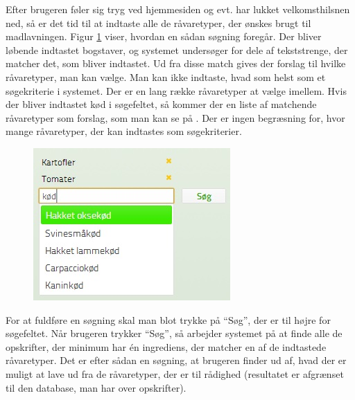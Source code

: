 Efter brugeren føler sig tryg ved hjemmesiden og evt. har lukket velkomsthilsnen ned, så er det tid til at indtaste alle de råvaretyper, der ønskes brugt til madlavningen. Figur \ref{fig:foodl-soegefelt} viser, hvordan en sådan søgning foregår. Der bliver løbende indtastet bogstaver, og systemet undersøger for dele af tekststrenge, der matcher det, som bliver indtastet. Ud fra disse match gives der forslag til hvilke råvaretyper, man kan vælge. Man kan ikke indtaste, hvad som helst som et søgekriterie i systemet. Der er en lang række råvaretyper at vælge imellem. Hvis der \fx bliver indtastet kød i søgefeltet, så kommer der en liste af matchende råvaretyper som forslag, som man kan se på . Der er ingen begræsning for, hvor mange råvaretyper, der kan indtastes som søgekriterier.

\begin{figure}[H]
	\centering
	\includegraphics[scale=0.7]{billeder/foodl/soegefelt.jpg}
	\label{fig:foodl-soegefelt}
\end{figure}


For at fuldføre en søgning skal man blot trykke på ``Søg'', der er til højre for søgefeltet. Når brugeren trykker ``Søg'', så arbejder systemet på at finde alle de opskrifter, der minimum har én ingrediens, der matcher en af de indtastede råvaretyper. Det er efter sådan en søgning, at brugeren finder ud af, hvad der er muligt at lave ud fra de råvaretyper, der er til rådighed (resultatet er afgrænset til den database, man har over opskrifter).
